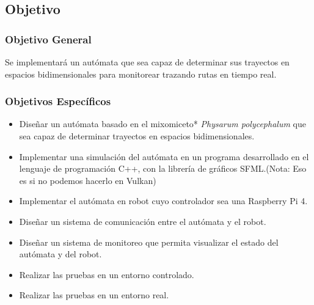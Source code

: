 \subsection{Objetivo}
\label{sec-1-1-1}
    \subsubsection{Objetivo General}
    \label{sec-1-1-1-1}
        Se implementar\'a un aut\'omata que sea capaz de determinar sus trayectos en espacios bidimensionales para
            monitorear trazando rutas en tiempo real.
    \subsubsection{Objetivos Espec\'ificos}
    \label{sec-1-1-1-2}
        \begin{itemize}
            \setlength\itemsep{-0.5em}
            \item Dise\~nar un aut\'omata basado en el mixomiceto* \textit{Physarum polycephalum} que sea capaz de determinar
                trayectos en espacios bidimensionales.
            \item Implementar una simulaci\'on del aut\'omata en un programa desarrollado en el lenguaje de programaci\'on
                C++, con la librer\'ia de gr\'aficos SFML.(Nota: Eso es si no podemos hacerlo en Vulkan)
            \item Implementar el aut\'omata en robot cuyo controlador sea una Raspberry Pi 4.
            \item Dise\~nar un sistema de comunicaci\'on entre el aut\'omata y el robot.
            \item Dise\~nar un sistema de monitoreo que permita visualizar el estado del aut\'omata y del robot.
            \item Realizar las pruebas en un entorno controlado.
            \item Realizar las pruebas en un entorno real.
        \end{itemize}